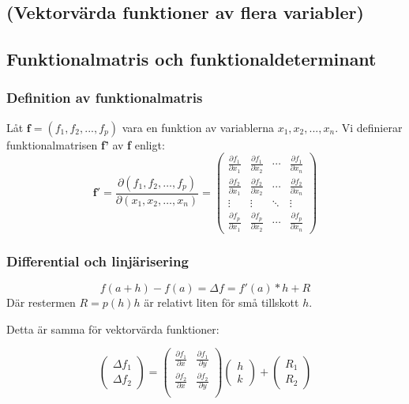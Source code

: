 \documentclass[a4paper,12pt]{article}
\begin{document}
\subsection{(Vektorvärda funktioner av flera variabler)}

\subsection{Funktionalmatris och funktionaldeterminant}
\subsubsection*{Definition av funktionalmatris}
Låt $\textbf{f} = (f_1, f_2, ..., f_p)$ vara en funktion av variablerna $x_1, x_2, ..., x_n$.
Vi definierar funktionalmatrisen \textbf{f'} av \textbf{f} enligt: 
\[
\mathbf{f}' = \frac{\partial (f_1, f_2, \ldots, f_p)}{\partial (x_1, x_2, \ldots, x_n)} =
\begin{pmatrix}
    \frac{\partial f_1}{\partial x_1} & \frac{\partial f_1}{\partial x_2} & \cdots & \frac{\partial f_1}{\partial x_n} \\
    \frac{\partial f_2}{\partial x_1} & \frac{\partial f_2}{\partial x_2} & \cdots & \frac{\partial f_2}{\partial x_n} \\
    \vdots & \vdots & \ddots & \vdots \\
    \frac{\partial f_p}{\partial x_1} & \frac{\partial f_p}{\partial x_2} & \cdots & \frac{\partial f_p}{\partial x_n}
\end{pmatrix}
\]

\subsubsection*{Differential och linjärisering}
\[
    f(a + h) - f(a) = \Delta f = f'(a)*h + R
\]
Där restermen $R = p(h)h$ är relativt liten för små tillskott $h$.

Detta är samma för vektorvärda funktioner:

\[
\begin{pmatrix}
    \Delta f_1 \\
    \Delta f_2
\end{pmatrix}
=
\begin{pmatrix}
    \frac{\partial f_1}{\partial x} & \frac{\partial f_1}{\partial y} \\ 
    \frac{\partial f_2}{\partial x} & \frac{\partial f_2}{\partial y} \\ 
\end{pmatrix}
\begin{pmatrix}
    h \\ k
\end{pmatrix}
+
\begin{pmatrix}
    R_1 \\ R_2
\end{pmatrix}
\]
\end{document}

